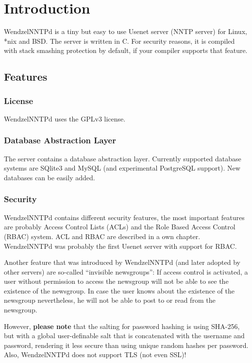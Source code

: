 \chapter{Introduction}

WendzelNNTPd is a tiny but easy to use Usenet server (NNTP server) for Linux, *nix and BSD. The server is written in C. For security reasons, it is compiled with stack smashing protection by default, if your compiler supports that feature.

\section{Features}

\subsection{License}

WendzelNNTPd uses the GPLv3 license.

\subsection{Database Abstraction Layer}

The server contains a database abstraction layer. Currently supported database systems are SQlite3 and MySQL (and experimental PostgreSQL support). New databases can be easily added.

\subsection{Security}

WendzelNNTPd contains different security features, the most important features are probably Access Control Lists (ACLs) and the Role Based Access Control (RBAC) system. ACL and RBAC are described in a own chapter. WendzelNNTPd was probably the first Usenet server with support for RBAC.

Another feature that was introduced by WendzelNNTPd (and later adopted by other servers) are so-called ``invisible newsgroups'': If access control is activated, a user without permission to access the newsgroup will not be able to see the existence of the newsgroup. In case the user knows about the existence of the newsgroup nevertheless, he will not be able to post to or read from the newsgroup.

However, \textbf{please note} that the salting for password hashing is using SHA-256, but with a global user-definable salt that is concatenated with the username and password, rendering it less secure than using unique random hashes per password. 
%
Also, WendzelNNTPd does not support TLS (not even SSL)!


